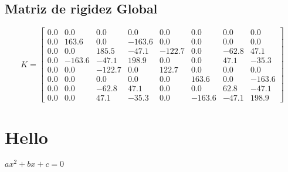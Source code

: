 \documentclass{article}%
\begin{document}
%
\subsection{Matriz de rigidez Global}%
\label{subsec:MatrizderigidezGlobal}%
\[%
K= \begin{bmatrix}%
0.0&0.0&0.0&0.0&0.0&0.0&0.0&0.0\\%
0.0&163.6&0.0&-163.6&0.0&0.0&0.0&0.0\\%
0.0&0.0&185.5&-47.1&-122.7&0.0&-62.8&47.1\\%
0.0&-163.6&-47.1&198.9&0.0&0.0&47.1&-35.3\\%
0.0&0.0&-122.7&0.0&122.7&0.0&0.0&0.0\\%
0.0&0.0&0.0&0.0&0.0&163.6&0.0&-163.6\\%
0.0&0.0&-62.8&47.1&0.0&0.0&62.8&-47.1\\%
0.0&0.0&47.1&-35.3&0.0&-163.6&-47.1&198.9%
\end{bmatrix}%
\]

%
\section{Hello}%
\label{sec:Hello}%
$ax^2 + bx + c = 0$

%
\end{document}
